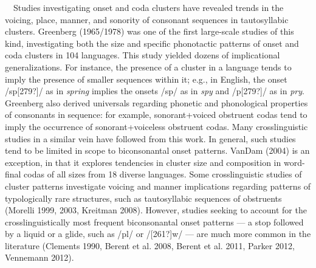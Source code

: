 \documentclass[12pt]{article}
\newenvironment{styleBody}{\renewcommand\baselinestretch{1.0}\setlength\leftskip{0in}\setlength\rightskip{0in plus 1fil}\setlength\parindent{0in}\setlength\parfillskip{0pt plus 1fil}\setlength\parskip{0in plus 1pt}\writerlistparindent\writerlistleftskip\leavevmode\normalfont\normalsize\fontsize{11pt}{13.2pt}\selectfont\mdseries\upshape\writerlistlabel\ignorespaces}{\unskip\vspace{0in plus 1pt}\par}
\newcommand\writerlistleftskip{}
\newcommand\writerlistparindent{}
\newcommand\writerlistlabel{}
\begin{document}
\begin{styleBody}
\ \ Studies investigating onset and coda clusters have revealed trends in the voicing, place, manner, and sonority of consonant sequences in tautosyllabic clusters. Greenberg (1965/1978) was one of the first large-scale studies of this kind, investigating both the size and specific phonotactic patterns of onset and coda clusters in 104 languages. This study yielded dozens of implicational generalizations. For instance, the presence of a cluster in a language tends to imply the presence of smaller sequences within it; e.g., in English, the onset /sp[279?]/ as in \textit{spring} implies the onsets /sp/ as in \textit{spy} and /p[279?]/ as in \textit{pry}. Greenberg also derived universals regarding phonetic and phonological properties of consonants in sequence: for example, sonorant+voiced obstruent codas tend to imply the occurrence of sonorant+voiceless obstruent codas. Many crosslinguistic studies in a similar vein have followed from this work. In general, such studies tend to be limited in scope to biconsonantal onset patterns. VanDam (2004) is an exception, in that it explores tendencies in cluster size and composition in word-final codas of all sizes from 18 diverse languages. Some crosslinguistic studies of cluster patterns investigate voicing and manner implications regarding patterns of typologically rare structures, such as tautosyllabic sequences of obstruents (Morelli 1999, 2003, Kreitman 2008). However, studies seeking to account for the crosslinguistically most frequent biconsonantal onset patterns — a stop followed by a liquid or a glide, such as /pl/ or /[261?]w/ — are much more common in the literature (Clements 1990, Berent et al. 2008, Berent et al. 2011, Parker 2012, Vennemann 2012). 
\end{styleBody}
\end{document}
